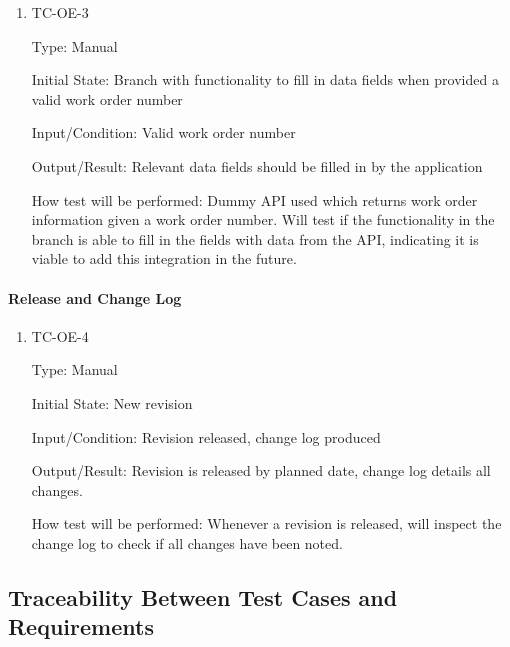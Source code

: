 \documentclass[12pt, titlepage]{article}
\begin{document}
\begin{enumerate}

  \item{TC-OE-3\\}

    Type: Manual

    Initial State: Branch with functionality to fill in data fields
    when provided a valid work order number

    Input/Condition: Valid work order number

    Output/Result: Relevant data fields should be filled in by the application

    How test will be performed: Dummy API used which returns work
    order information given a work order number. Will test if the
    functionality in the branch is able to fill in the fields with
    data from the API, indicating it is viable to add this
    integration in the future.

\end{enumerate}

\paragraph{Release and Change Log}

\begin{enumerate}

  \item{TC-OE-4\\}

    Type: Manual

    Initial State: New revision

    Input/Condition: Revision released, change log produced

    Output/Result: Revision is released by planned date, change log
    details all changes.

    How test will be performed: Whenever a revision is released, will
    inspect the change log to check if all changes have been noted.

\end{enumerate}

\subsection{Traceability Between Test Cases and Requirements}

\end{document}
